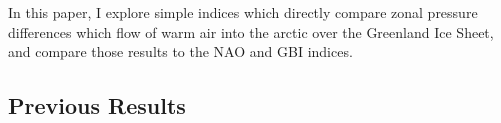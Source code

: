 \documentclass[11pt]{report}
\begin{document}
In this paper, I explore simple indices which directly compare zonal pressure differences which flow of warm air into the arctic over the Greenland Ice Sheet, and compare those results to the NAO and GBI indices.



 
 











\subsection{Previous Results \label{sec:prevresults}}


\end{document}
